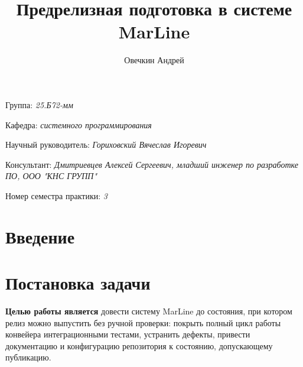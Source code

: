 \documentclass[a4paper]{article}
\title{Предрелизная подготовка в системе MarLine}
\author{Овечкин Андрей}
\date{}
\begin{document}
\maketitle

\begin{flushright}
    Группа: \emph{25.Б72-мм}

    Кафедра: \emph{системного программирования}

    Научный руководитель: \emph{Гориховский Вячеслав Игоревич}

    Консультант: \emph{Дмитриевцев Алексей Сергеевич, младший инженер по разработке ПО, ООО "КНС ГРУПП"}

    Номер семестра практики: \emph{3}
\end{flushright} 

\section{Введение}



\section{Постановка задачи}

\textbf{Целью работы является} довести систему MarLine до состояния, при котором релиз можно выпустить без ручной проверки: покрыть полный цикл работы конвейера интеграционными тестами, устранить дефекты, привести документацию и конфигурацию репозитория к состоянию, допускающему публикацию.
\end{document}
